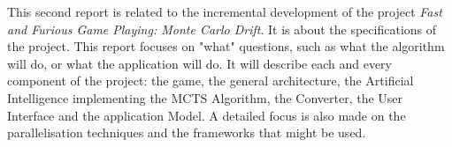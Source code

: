 This second report is related to the incremental development of the project \textit{Fast and Furious Game Playing: Monte Carlo Drift}. It is about the specifications of the project.
This report focuses on "what" questions, such as what the algorithm will do, or what the application will do. It will describe each and every component of the project: the game, the general architecture, the Artificial Intelligence implementing the MCTS Algorithm, the Converter, the User Interface and the application Model. A detailed focus is also made on the parallelisation techniques and the frameworks that might be used.